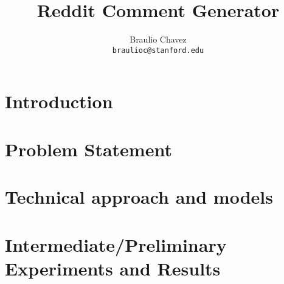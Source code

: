 \documentclass{article} %
\begin{document}
\title{Reddit Comment Generator}
\author{Braulio Chavez \\
  \texttt{braulioc@stanford.edu}}
\maketitle

\section{Introduction}

\section{Problem Statement}

\section{Technical approach and models}
\section{Intermediate/Preliminary Experiments and Results}
\end{document}
